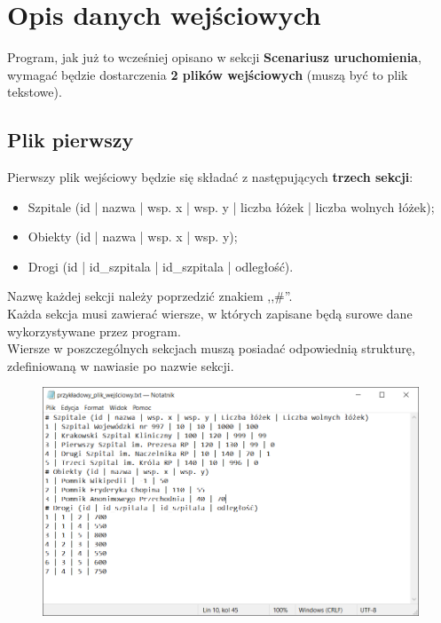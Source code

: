 \documentclass{article}
\begin{document}
\section{Opis danych wejściowych}
{\fontsize{12}{12}\selectfont

Program, jak już to wcześniej opisano w sekcji \textbf{Scenariusz uruchomienia},  wymagać będzie dostarczenia \textbf{2 plików wejściowych} (muszą być to plik tekstowe). 

\subsection{Plik pierwszy}
Pierwszy plik wejściowy będzie się składać z następujących \textbf{trzech sekcji}:
\begin{itemize}
    \item Szpitale (id | nazwa | wsp. x | wsp. y | liczba łóżek | liczba wolnych łóżek);
    \item Obiekty (id | nazwa | wsp. x | wsp. y);
    \item Drogi (id | id\_szpitala | id\_szpitala | odległość).
\end{itemize}

Nazwę każdej sekcji należy poprzedzić znakiem ,,\#''. \\
Każda sekcja musi zawierać wiersze,  w których zapisane będą surowe dane wykorzystywane przez program.  \\
Wiersze w poszczególnych sekcjach muszą posiadać odpowiednią strukturę, zdefiniowaną w nawiasie po nazwie sekcji.

    \begin{figure} [hbt!]
        \centering
        \includegraphics[width=14cm]{images/przykładowy_plik_wejściowy.PNG}
    \end{figure}
    
}
\end{document}
